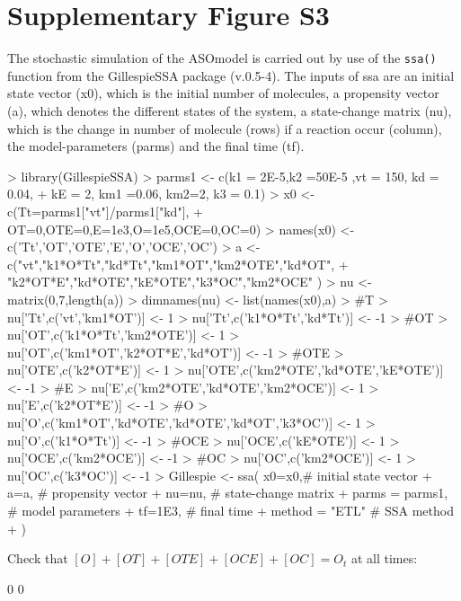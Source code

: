 \documentclass[a4paper,11pt]{article}
\begin{document}
\section{Supplementary Figure S3}
The stochastic simulation of the ASOmodel is carried out by use of the \texttt{ssa()} function from the GillespieSSA package (v.0.5-4). The inputs of ssa are an initial state vector (x0), which is the initial number of molecules, a propensity vector (a), which denotes the different states of the system, a state-change matrix (nu), which is the change in number of molecule (rows) if a reaction occur (column), the model-parameters (parms) and the final time (tf).
\begin{Schunk}
\begin{Sinput}
> library(GillespieSSA)
> parms1 <- c(k1 = 2E-5,k2 =50E-5 ,vt = 150,  kd = 0.04,		  
+               kE = 2, km1 =0.06, km2=2, k3 = 0.1)
> x0 <- c(Tt=parms1["vt"]/parms1["kd"],
+         OT=0,OTE=0,E=1e3,O=1e5,OCE=0,OC=0)
> names(x0) <- c('Tt','OT','OTE','E','O','OCE','OC')
> a <-  c("vt","k1*O*Tt","kd*Tt","km1*OT","km2*OTE","kd*OT",
+         "k2*OT*E","kd*OTE","kE*OTE","k3*OC","km2*OCE" )
> nu <- matrix(0,7,length(a))
> dimnames(nu) <- list(names(x0),a)
> #T
> nu['Tt',c('vt','km1*OT')] <- 1
> nu['Tt',c('k1*O*Tt','kd*Tt')] <- -1 
> #OT
> nu['OT',c('k1*O*Tt','km2*OTE')] <- 1
> nu['OT',c('km1*OT','k2*OT*E','kd*OT')] <- -1
> #OTE
> nu['OTE',c('k2*OT*E')] <- 1
> nu['OTE',c('km2*OTE','kd*OTE','kE*OTE')] <- -1
> #E
> nu['E',c('km2*OTE','kd*OTE','km2*OCE')] <- 1
> nu['E',c('k2*OT*E')] <- -1
> #O
> nu['O',c('km1*OT','kd*OTE','kd*OTE','kd*OT','k3*OC')] <- 1
> nu['O',c('k1*O*Tt')] <- -1
> #OCE
> nu['OCE',c('kE*OTE')] <- 1
> nu['OCE',c('km2*OCE')] <- -1
> #OC
> nu['OC',c('km2*OCE')] <- 1
> nu['OC',c('k3*OC')] <- -1
> Gillespie <- ssa( x0=x0,# initial state vector
+       a=a, # propensity vector
+       nu=nu, # state-change matrix
+       parms = parms1, # model parameters
+       tf=1E3, # final time
+       method = "ETL" # SSA method
+ )
\end{Sinput}
\end{Schunk}
Check that $[O]+[OT]+[OTE]+[OCE]+[OC] = O_t$ at all times:
\begin{Schunk}
\begin{Soutput}
[1] 0 0
\end{Soutput}
\end{Schunk}
\end{document}
